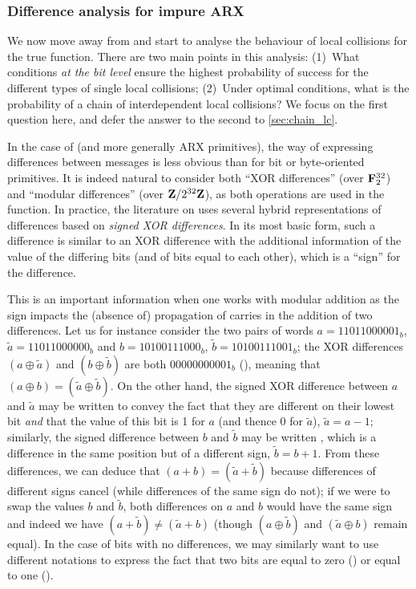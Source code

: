 \subsubsection{Difference analysis for impure ARX}
\label{sec:diffs_ana}
We now move away from \shiun and start to analyse the behaviour of local collisions for the true \sha function. There are two main points in this analysis: (1)~What conditions \emph{at the bit level}
ensure the highest probability of success for the different types of single local collisions; (2)~Under optimal conditions, what is the probability of a chain of interdependent local collisions?
We focus on the first question here, and defer the answer to the second to \autoref{sec:chain_lc}.

\medskip

In the case of \sha (and more generally ARX primitives), the way of expressing differences between messages is less obvious than for
\eg{} bit or byte-oriented primitives. It is indeed natural to consider both ``XOR differences'' (over $\mathbf{F}_{2}^{32}$) and
``modular differences'' (over $\mathbf{Z}/2^{32}\mathbf{Z}$), as both operations are used in the function.
In practice, the literature on \sha uses several hybrid representations of differences based on \emph{signed XOR differences}.
In its most basic form, such a difference is similar to an XOR difference with the additional information of the value of the differing bits (and of bits equal to each other),
which is a ``sign'' for the difference.

This is an important information when one works with modular addition as the sign impacts the (absence of) propagation of carries in the addition of two differences.
Let us for instance consider the two pairs of words $a = 11011000001_b$, $\widetilde{a} = 11011000000_b$ and $b = 10100111000_b$, $\widetilde{b} = 10100111001_b$; the XOR
differences $(a \oplus \widetilde{a})$ and $(b \oplus \widetilde{b})$ are both $00000000001_b$ (\ie \nodiff\nodiff\nodiff\nodiff\nodiff\nodiff\nodiff\nodiff\nodiff\nodiff\onediff),
meaning that $(a \oplus b) = (\widetilde{a} \oplus \widetilde{b})$. On the other hand, the signed
XOR difference between $a$ and $\widetilde{a}$ may be written \nodiff\nodiff\nodiff\nodiff\nodiff\nodiff\nodiff\nodiff\nodiff\nodiff\onediffd to convey the fact that they are different on their lowest bit \emph{and} that
the value of this bit is 1 for $a$ (and thence 0 for $\widetilde{a}$), \ie $\widetilde{a} = a - 1$; similarly, the signed difference between $b$ and $\widetilde{b}$ may be written
\nodiff\nodiff\nodiff\nodiff\nodiff\nodiff\nodiff\nodiff\nodiff\nodiff\onediffu, which is a difference in the same position but of a different sign, \ie $\widetilde{b} = b + 1$. From these differences, we can deduce that $(a + b) = (\widetilde{a} + \widetilde{b})$
because differences of different signs cancel (while differences of the same sign do not); if we were to swap the values $b$ and $\widetilde{b}$, both differences on $a$ and $b$ would have the same sign and
indeed we have $(a + \widetilde{b}) \neq (\widetilde{a} + b)$ (though $(a \oplus \widetilde{b})$ and $(\widetilde{a} \oplus b)$ remain equal).
In the case of bits with no differences, we may similarly want to use different notations to express the fact that two bits are equal to zero (\nodiffz) or equal to one (\nodiffo).

